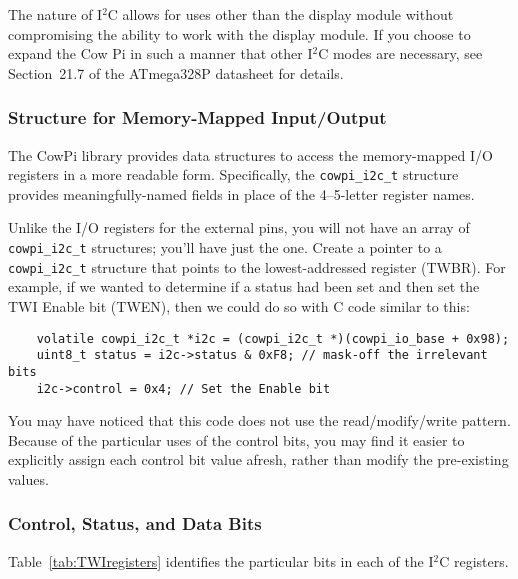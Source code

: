 The nature of I$^2$C allows for uses other than the display module without compromising the ability to work with the display module.
If you choose to expand the Cow Pi in such a manner that other I$^2$C modes are necessary, see Section~21.7 of the ATmega328P datasheet\cite{ATmega328P} for details.

\subsubsection{Structure for Memory-Mapped Input/Output} \label{subsubsec:TWIstruct}

The CowPi library provides data structures to access the memory-mapped I/O registers in a more readable form.
Specifically, the \lstinline{cowpi_i2c_t} structure provides meaningfully-named fields in place of the 4--5-letter register names.



Unlike the I/O registers for the external pins, you will not have an array of \lstinline{cowpi_i2c_t} structures;
you'll have just the one.
Create a pointer to a \lstinline{cowpi_i2c_t} structure that points to the lowest-addressed register (TWBR).
For example, if we wanted to determine if a status had been set and then set the TWI Enable bit (TWEN), then we could do so with C code similar to this:

\begin{lstlisting}
    volatile cowpi_i2c_t *i2c = (cowpi_i2c_t *)(cowpi_io_base + 0x98);
    uint8_t status = i2c->status & 0xF8; // mask-off the irrelevant bits
    i2c->control = 0x4; // Set the Enable bit
\end{lstlisting}


You may have noticed that this code does not use the read/modify/write pattern.
Because of the particular uses of the control bits, you may find it easier to explicitly assign each control bit value afresh, rather than modify the pre-existing values.

\subsubsection{Control, Status, and Data Bits} \label{subsubsec:TWIbits}

Table~\ref{tab:TWIregisters} identifies the particular bits in each of the I$^2$C registers.

